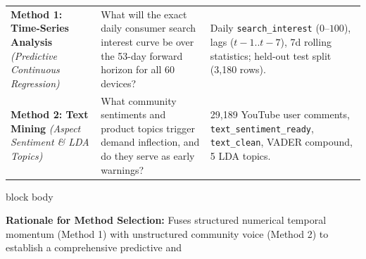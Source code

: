 \documentclass[aspectratio=169, 10pt]{beamer}
\newenvironment{card}[1][]{%
        \begin{beamercolorbox}[rounded=true,shadow=false,wd=\linewidth,sep=3.5pt,#1]{block body}%
        \fontsize{7.8pt}{9.8pt}\selectfont%
    }{%
        \end{beamercolorbox}%
    }
\begin{document}
\begin{frame}[t]
\begin{table}[h]
\begin{tabular}{p{3.8cm}p{4.6cm}p{4.5cm}}
                \textbf{Method 1: Time-Series Analysis} \newline \textit{(Predictive Continuous Regression)} & What will the exact daily consumer search interest curve be over the 53-day forward     
  horizon for all 60 devices? & Daily \texttt{search\_interest} ($0$--$100$), lags ($t-1..t-7$), 7d rolling statistics; held-out test split (3,180 rows). \\                                           
                \addlinespace[4pt]                                                                                                                                                                     
                \textbf{Method 2: Text Mining} \newline \textit{(Aspect Sentiment \& LDA Topics)} & What community sentiments and product topics trigger demand inflection, and do they serve as early 
  warnings? & 29,189 YouTube user comments, \texttt{text\_sentiment\_ready}, \texttt{text\_clean}, VADER compound, 5 LDA topics. \\                                                                    
                \bottomrule                                                                                                                                                                            
            \end{tabular}                                                                                                                                                                              
        \end{table}                                                                                                                                                                                    
        \vspace{-0.1cm}                                                                                                                                                                                
        \begin{card}                                                                                                                                                                                   
            \centering\scriptsize                                                                                                                                                                      
            \textbf{Rationale for Method Selection:} Fuses structured numerical temporal momentum (Method 1) with unstructured community voice (Method 2) to establish a comprehensive predictive and  

\end{card}
\end{frame}
\end{document}
